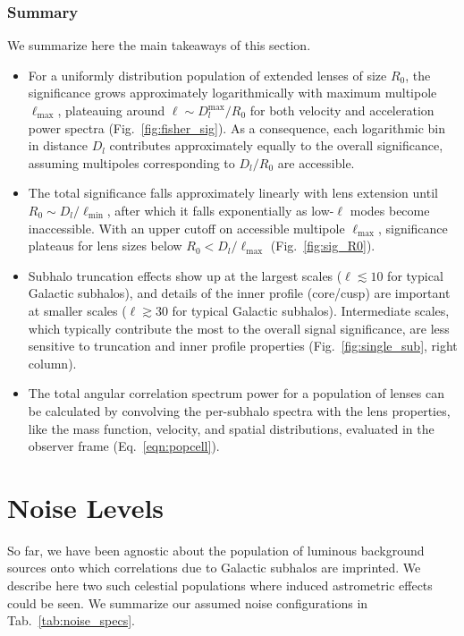 \documentclass[prd,aps,10pt,nofootinbib,twocolumn,superscriptaddress,preprintnumbers,balancelastpage,longbibliography]{revtex4-1}
\newcommand{\SMS}[1]{{\bf \color{deepgreen}{[SM: #1]}}}
\begin{document}
\subsubsection{Summary}
\label{sec:summary}

We summarize here the main takeaways of this section. %
\begin{itemize}
\item For a uniformly distribution population of extended lenses of size $R_0$, the significance grows approximately logarithmically with maximum multipole $\ell_\mathrm{max}$, plateauing around $\ell\sim D_l^{\mathrm{max}}/R_0$ for both velocity and acceleration power spectra (Fig.~\ref{fig:fisher_sig}). As a consequence, each logarithmic bin in distance $D_l$ contributes approximately equally to the overall significance, assuming multipoles corresponding to $D_l/R_0$ are accessible.
\item The total significance falls approximately linearly with lens extension until $R_0\sim D_l / \ell_\mathrm{min}$, after which it falls exponentially as low-$\ell$ modes become inaccessible. With an upper cutoff on accessible multipole $\ell_\mathrm{max}$, significance plateaus for lens sizes below $R_0 < D_l / \ell_\mathrm{max}$ (Fig.~\ref{fig:sig_R0}).
\item Subhalo truncation effects show up at the largest scales ($\ell \lesssim 10$ for typical Galactic subhalos), and details of the inner profile (core/cusp) are important at smaller scales ($\ell \gtrsim 30$ for typical Galactic subhalos). Intermediate scales, which typically contribute the most to the overall signal significance, are less sensitive to truncation and inner profile properties (Fig.~\ref{fig:single_sub}, right column).
\item The total angular correlation spectrum power for a population of lenses can be calculated by convolving the per-subhalo spectra with the lens properties, like the mass function, velocity, and spatial distributions, evaluated in the observer frame (Eq.~\ref{eqn:popcell}).
\end{itemize}


\section{Noise Levels}
\label{sec:noise}

So far, we have been agnostic about the population of luminous background sources onto which correlations due to Galactic subhalos are imprinted. We describe here two such celestial populations where induced astrometric effects could be seen. We summarize our assumed noise configurations in Tab.~\ref{tab:noise_specs}.
\end{document}
